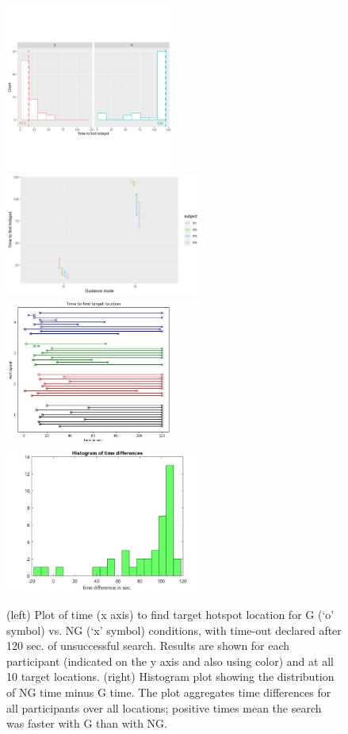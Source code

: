 \documentclass[runningheads]{res/templates/llncs}
\begin{document}
\begin{figure}
\includegraphics[width=5.5cm, keepaspectratio,]{res/img/histNG.png}
\includegraphics[width=6.5cm, keepaspectratio,]{res/img/lines.png}
\includegraphics[width=5.5cm, keepaspectratio,]{res/img/fig2a.jpg}
\includegraphics[width=6.5cm, keepaspectratio,]{res/img/fig2b.jpg}
\caption{(left) Plot of time (x axis) to find target hotspot location for G (‘o’ symbol) vs. NG  (‘x’ symbol) conditions, with time-out declared after 120 sec. of unsuccessful search. Results are shown for each participant (indicated on the y axis and also using color) and at all 10 target locations. (right) Histogram plot showing the distribution of NG time minus G time. The plot aggregates time differences for all participants over all locations; positive times mean the search was faster with G than with NG.}
\label{fig:res}
\end{figure}
\end{document}
